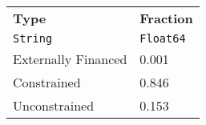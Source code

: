 \begin{tabular}{ll}
  \hline\hline
  \textbf{Type} & \textbf{Fraction} \\
  \texttt{String} & \texttt{Float64} \\\hline
  Externally Financed & 0.001 \\
  Constrained & 0.846 \\
  Unconstrained & 0.153 \\\hline\hline
\end{tabular}
